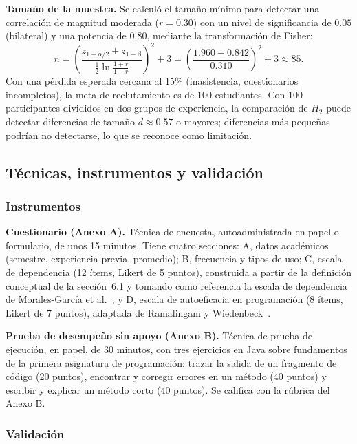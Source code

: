 \documentclass[12pt,letterpaper]{article}
\numberwithin{table}{section}
\numberwithin{figure}{section}
\begin{document}
\textbf{Tamaño de la muestra.} Se calculó el tamaño mínimo para detectar una correlación de magnitud moderada ($r = 0.30$) con un nivel de significancia de $0.05$ (bilateral) y una potencia de $0.80$, mediante la transformación de Fisher:
\[
n = \left(\frac{z_{1-\alpha/2} + z_{1-\beta}}{\frac{1}{2}\ln\frac{1+r}{1-r}}\right)^2 + 3 = \left(\frac{1.960 + 0.842}{0.310}\right)^2 + 3 \approx 85.
\]
Con una pérdida esperada cercana al 15\% (inasistencia, cuestionarios incompletos), la meta de reclutamiento es de 100 estudiantes. Con 100 participantes divididos en dos grupos de experiencia, la comparación de $H_2$ puede detectar diferencias de tamaño $d \approx 0.57$ o mayores; diferencias más pequeñas podrían no detectarse, lo que se reconoce como limitación.

\subsection{Técnicas, instrumentos y validación}

\subsubsection{Instrumentos}

\textbf{Cuestionario (Anexo A).} Técnica de encuesta, autoadministrada en papel o formulario, de unos 15 minutos. Tiene cuatro secciones: A, datos académicos (semestre, experiencia previa, promedio); B, frecuencia y tipos de uso; C, escala de dependencia (12 ítems, Likert de 5 puntos), construida a partir de la definición conceptual de la sección~6.1 y tomando como referencia la escala de dependencia de Morales-García et al.~\cite{moralesgarcia2024development}; y D, escala de autoeficacia en programación (8 ítems, Likert de 7 puntos), adaptada de Ramalingam y Wiedenbeck~\cite{ramalingam1998development}.

\textbf{Prueba de desempeño sin apoyo (Anexo B).} Técnica de prueba de ejecución, en papel, de 30 minutos, con tres ejercicios en Java sobre fundamentos de la primera asignatura de programación: trazar la salida de un fragmento de código (20 puntos), encontrar y corregir errores en un método (40 puntos) y escribir y explicar un método corto (40 puntos). Se califica con la rúbrica del Anexo B.

\subsubsection{Validación}
\end{document}
